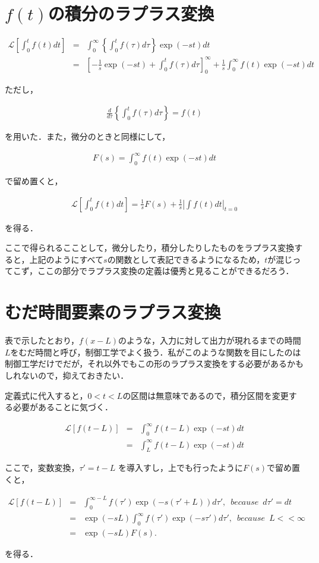 \documentclass[a4paper, 12pt]{jsarticle}
\begin{document}
\section{$f(t)$の積分のラプラス変換}
\begin{eqnarray}
\mathcal{L} \left[\int_0^t f(t) dt\right] &=& \int_0^\infty \left\{\int_0^t f(\tau) d\tau\right\} \exp(-st) dt \\ \nonumber
&=& \left[-\frac1s\exp(-st) + \int_0^t f(\tau) d\tau\right]_0^\infty + \frac1s \int_0^\infty f(t) \exp(-st) dt
\end{eqnarray}

ただし，

\begin{eqnarray}
    \frac{d}{d\tau} \left\{\int_0^t f(\tau) d\tau\right\} = f(t)
\end{eqnarray}

を用いた．また，微分のときと同様にして，

\begin{eqnarray}
F(s) = \int_0^\infty f(t) \exp(-st) dt
\end{eqnarray}

で留め置くと，

\begin{eqnarray}
    \mathcal{L} \left[\int_0^t f(t) dt\right] = \frac1s F(s) + \frac1s \left| \int f(t) dt \right|_{t = 0}
\end{eqnarray}

を得る．

ここで得られるこことして，微分したり，積分したりしたものをラプラス変換すると，上記のようにすべて$s$の関数として表記できるようになるため，$t$が混じってこず，ここの部分でラプラス変換の定義は優秀と見ることができるだろう．

\section{むだ時間要素のラプラス変換}
表で示したとおり，$f(x-L)$のような，入力に対して出力が現れるまでの時間$L$をむだ時間と呼び，制御工学でよく扱う．私がこのような関数を目にしたのは制御工学だけでだが，それ以外でもこの形のラプラス変換をする必要があるかもしれないので，抑えておきたい．
\par
定義式に代入すると，$0 < t < L$の区間は無意味であるので，積分区間を変更する必要があることに気づく．

\begin{eqnarray}
    \mathcal{L} \left[f(t-L)\right] &=& \int_0^\infty f(t-L) \exp(-st) dt \\ \nonumber
&=& \int_L^\infty f(t - L) \exp(-st) dt
\end{eqnarray}

ここで，変数変換，$\tau' = t-L$ を導入すし，上でも行ったように$F(s)$で留め置くと，

\begin{eqnarray}
    \mathcal{L}[f(t-L)] &=& \int_0^{\infty-L} f(\tau') \exp(-s(\tau' + L)) d\tau', \,\,\, because \,\,\, d\tau' = dt \\ \nonumber
&=& \exp(-sL) \int_0^\infty f(\tau')\exp(-s\tau') d\tau', \,\,\, because \,\,\, L << \infty \\ \nonumber
&=& \exp(-sL)F(s).
\end{eqnarray}

を得る．
\end{document}
